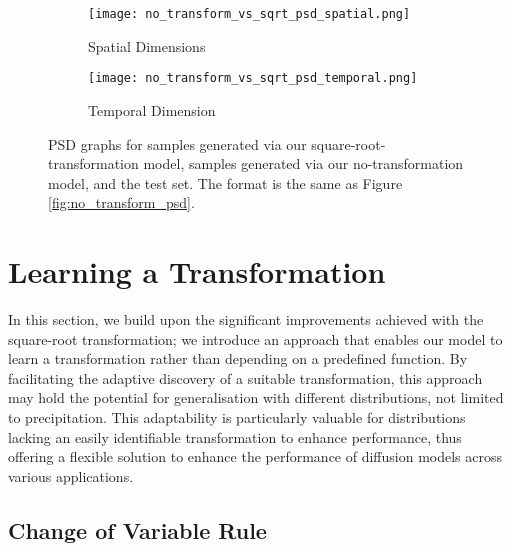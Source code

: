 \documentclass[ oneside,%
                    author={George Herbert},
                    degree={MSci},
                     title={Diffusion Models for Time-Evolving Precipitation Fields},
                  subtitle={}]{dissertation}
\begin{document}
\begin{figure}[htbp]
      \centering
      \begin{subfigure}{0.49\textwidth}
            \texttt{[image: no\_transform\_vs\_sqrt\_psd\_spatial.png]}
            \caption{Spatial Dimensions}
      \end{subfigure}
      \begin{subfigure}{0.49\textwidth}
            \texttt{[image: no\_transform\_vs\_sqrt\_psd\_temporal.png]}
            \caption{Temporal Dimension}
      \end{subfigure}
      \caption{PSD graphs for samples generated via our square-root-transformation model, samples generated via our no-transformation model, and the test set. The format is the same as Figure \ref{fig:no_transform_psd}.}
      \label{fig:no_transform_vs_sqrt_psd}
\end{figure}

\section{Learning a Transformation}
\label{sec:results_learning_transformation}

In this section, we build upon the significant improvements achieved with the square-root transformation; we introduce an approach that enables our model to learn a transformation rather than depending on a predefined function. By facilitating the adaptive discovery of a suitable transformation, this approach may hold the potential for generalisation with different distributions, not limited to precipitation. This adaptability is particularly valuable for distributions lacking an easily identifiable transformation to enhance performance, thus offering a flexible solution to enhance the performance of diffusion models across various applications.

\subsection{Change of Variable Rule}
\label{sec:results_change_of_variable}
\end{document}
